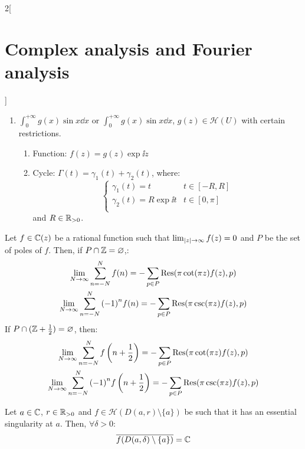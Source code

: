 \documentclass[../../../main.tex]{subfiles}
\begin{document}
\begin{multicols}{2}[\section{Complex analysis and Fourier analysis}]
\begin{method}
\begin{enumerate}
\begin{enumerate}
$$                    $$
                    and $\varepsilon,\delta,R\in\RR_{>0}$.
            \end{enumerate}
      \item $\displaystyle\int_0^{+\infty} g(x)\sin{x}\dd{x}$ or $\displaystyle\int_0^{+\infty} g(x)\sin{x}\dd{x}$, $g(z)\in\mathcal{H}(U)$ with certain restrictions.
            \begin{enumerate}
              \item Function: $f(z)=g(z)\exp{\ii z}$
              \item Cycle:  $\Gamma(t)=\gamma_1(t)+\gamma_2(t)$, where:
                    $$
                      \begin{cases}
                        \gamma_1(t)=t            & t\in[-R,R]  \\
                        \gamma_2(t)=R\exp{\ii t} & t\in[0,\pi] \\
                      \end{cases}
                    $$
                    and $R\in\mathbb{R}_{>0}$.
            \end{enumerate}
    \end{enumerate}
  \end{method}
  \begin{theorem}
    Let $f\in\mathbb{C}(z)$ be a rational function such that $\lim_{\abs{z}\to\infty}f(z)=0$ and $P$ be the set of poles of $f$. Then, if $P\cap\mathbb{Z}=\varnothing$,:
    \begin{gather*}
      \lim_{N\to\infty}\sum_{n=-N}^Nf(n)         =-\sum_{p\in P}\Res(\pi\cot(\pi z)f(z),p) \\
      \lim_{N\to\infty}\sum_{n=-N}^N{(-1)}^nf(n) =-\sum_{p\in P}\Res(\pi\csc(\pi z)f(z),p)
    \end{gather*}
    If $P\cap(\mathbb{Z}+\frac{1}{2})=\varnothing$, then:
    \begin{gather*}
      \lim_{N\to\infty}\sum_{n=-N}^Nf\left(n+\frac{1}{2}\right)         =-\sum_{p\in P}\Res(\pi\cot(\pi z)f(z),p) \\
      \lim_{N\to\infty}\sum_{n=-N}^N{(-1)}^nf\left(n+\frac{1}{2}\right) =-\sum_{p\in P}\Res(\pi\csc(\pi z)f(z),p)
    \end{gather*}
  \end{theorem}
  \begin{theorem}
    Let $a\in\mathbb{C}$, $r\in\mathbb{R}_{>0}$ and $f\in\mathcal{H}(D(a,r)\setminus\{a\})$ be such that it has an essential singularity at $a$. Then, $\forall \delta>0$: $$\overline{f(D(a,\delta)\setminus\{a\})}=\mathbb{C}$$

\end{theorem}
\end{multicols}
\end{document}
